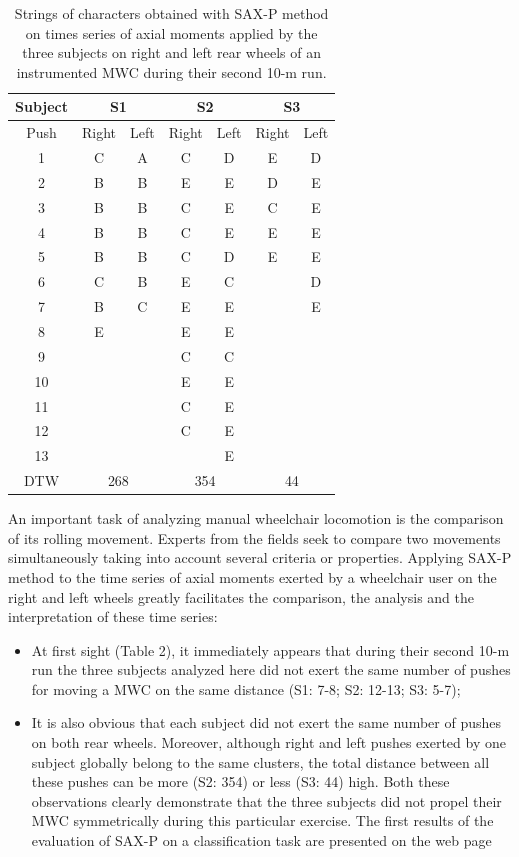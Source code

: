 \begin{center}

\begin{table}
\begin{tabular}{|c|c|c|c|c|c|c|}
\hline 
Subject & \multicolumn{2}{c|}{S1} & \multicolumn{2}{c|}{S2} & \multicolumn{2}{c|}{S3}\tabularnewline
\hline 
\hline 
Push & Right & Left & Right & Left & Right & Left\tabularnewline
\hline 
1 & C & A & C & D & E & D\tabularnewline
\hline 
2 & B & B & E & E & D & E\tabularnewline
\hline 
3 & B & B & C & E & C & E\tabularnewline
\hline 
4 & B & B & C & E & E & E\tabularnewline
\hline 
5 & B & B & C & D & E & E\tabularnewline
\hline 
6 & C & B & E & C &  & D\tabularnewline
\hline 
7 & B & C & E & E &  & E\tabularnewline
\hline 
8 & E &  & E & E &  & \tabularnewline
\hline 
9 &  &  & C & C &  & \tabularnewline
\hline 
10 &  &  & E & E &  & \tabularnewline
\hline 
11 &  &  & C & E &  & \tabularnewline
\hline 
12 &  &  & C & E &  & \tabularnewline
\hline 
13 &  &  &  & E &  & \tabularnewline
\hline 
DTW & \multicolumn{2}{c|}{268} & \multicolumn{2}{c|}{354} & \multicolumn{2}{c|}{44}\tabularnewline
\hline 
\end{tabular}

\protect\caption{Strings of characters obtained with SAX-P method on times series of
axial moments applied by the three subjects on right and left rear
wheels of an instrumented MWC during their second 10-m run.}
\label{tab:symbole}

\end{table}

\end{center}





An important task of analyzing manual wheelchair locomotion 
 is the comparison of its rolling movement. Experts from the fields seek to 
 compare two movements simultaneously taking into account 
 several criteria or properties. Applying SAX-P method to the time series 
 of axial moments exerted
by a wheelchair user on the right and left wheels greatly
facilitates the comparison, the analysis and the interpretation of these time series: 
\begin{itemize}
\item At first sight (Table 2), it immediately appears that during their
second 10-m run the three subjects analyzed here did not exert the
same number of pushes for moving a MWC on the same distance (S1:
7-8; S2: 12-13; S3: 5-7); 
\item It is also obvious that each subject did not exert the same number
of pushes on both rear wheels. Moreover, although right and left pushes
exerted by one subject globally belong to the same clusters, the total
distance between all these pushes can be more (S2: 354) or less (S3:
44) high. Both these observations clearly demonstrate that the three
subjects did not propel their MWC symmetrically during this particular
exercise. The first results of the evaluation of SAX-P on a classification task are presented on
the web page \cite{Validation}
\end{itemize}


